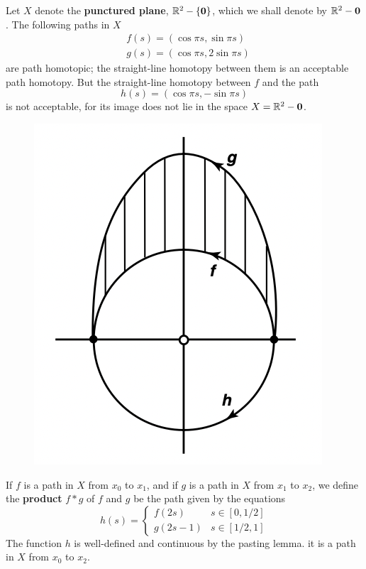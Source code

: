 \documentclass[11pt]{article}
\begin{document}
\begin{examplle}[]
Let \(X\) denote the \textbf{punctured plane}, \(\mathbb{R}^2-\{\textbf{0}\}\), which we shall denote
by \(\mathbb{R}^2-\mathbf{0}\). The following paths in \(X\)
\begin{align*}
&f(s)=(\cos\pi s,\sin\pi s)\\
&g(s)=(\cos\pi s,2\sin\pi s)
\end{align*}
are path homotopic; the straight-line homotopy between them is an acceptable path homotopy. But
the straight-line homotopy between \(f\) and the path
\begin{equation*}
h(s)=(\cos\pi s,-\sin\pi s)
\end{equation*}
is not acceptable, for its image does not lie in the space \(X=\mathbb{R}^2-\mathbf{0}\).

\begin{figure}[htbp]
\centering
\includegraphics[width=.4\textwidth]{../images/Topology/11.png}
\label{}
\end{figure}
\end{examplle}

\begin{definition}[]
If \(f\) is a path in \(X\) from \(x_0\) to \(x_1\), and if \(g\) is a path in \(X\) from \(x_1\)
to \(x_2\), we define the \textbf{product} \(f*g\) of \(f\) and \(g\) be the path given by the equations
\begin{equation*}
h(s)=
\begin{cases}
f(2s)&s\in[0,1/2]\\
g(2s-1)&s\in[1/2,1]
\end{cases}
\end{equation*}
The function \(h\) is well-defined and continuous by the pasting lemma. it is a path in \(X\)
from \(x_0\) to \(x_2\).
\end{definition}
\end{document}
